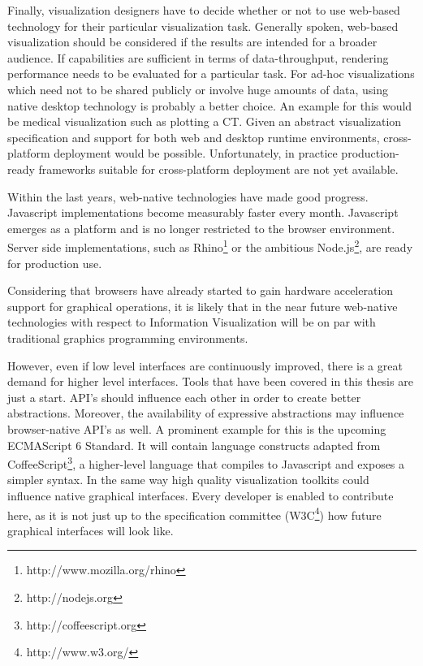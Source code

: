 Finally, visualization designers have to decide whether or not to use web-based technology for their particular visualization task. Generally spoken, web-based visualization should be considered if the results are intended for a broader audience. If capabilities are sufficient in terms of data-throughput, rendering performance needs to be evaluated for a particular task. For ad-hoc visualizations which need not to be shared publicly or involve huge amounts of data, using native desktop technology is probably a better choice. An example for this would be medical visualization such as plotting a CT. Given an abstract visualization specification and support for both web and desktop runtime environments, cross-platform deployment would be possible. Unfortunately, in practice production-ready frameworks suitable for cross-platform deployment are not yet available.

\SuperPar Within the last years, web-native technologies have made good progress. Javascript implementations become measurably faster every month. Javascript emerges as a platform and is no longer restricted to the browser environment. Server side implementations, such as Rhino\footnote{http://www.mozilla.org/rhino} or the ambitious Node.js\footnote{http://nodejs.org}, are ready for production use.

Considering that browsers have already started to gain hardware acceleration support for graphical operations, it is likely that in the near future web-native technologies with respect to Information Visualization will be on par with traditional graphics programming environments.

However, even if low level interfaces are continuously improved, there is a great demand for higher level interfaces. Tools that have been covered in this thesis are just a start. API's should influence each other in order to create better abstractions. Moreover, the availability of expressive abstractions may influence browser-native API's as well. A prominent example for this is the upcoming ECMAScript 6 Standard. It will contain language constructs adapted from CoffeeScript\footnote{http://coffeescript.org}, a higher-level language that compiles to Javascript and exposes a simpler syntax. In the same way high quality visualization toolkits could influence native graphical interfaces. Every developer is enabled to contribute here, as it is not just up to the specification committee (W3C\footnote{http://www.w3.org/}) how future graphical interfaces will look like.